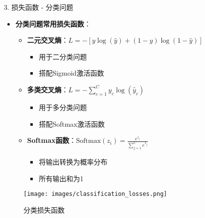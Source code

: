 \documentclass[
  ignorenonframetext,
  aspectratio=169,
  chinese-hans,
]{beamer}
\providecommand{\tightlist}{%
  \setlength{\itemsep}{0pt}\setlength{\parskip}{0pt}}\usepackage{longtable,booktabs,array}
\begin{document}
\begin{frame}{3. 损失函数 - 分类问题}
\label{ux635fux5931ux51fdux6570---ux5206ux7c7bux95eeux9898}
\begin{itemize}
\item
  \textbf{分类问题常用损失函数}：

  \begin{itemize}
  \tightlist
  \item
    \textbf{二元交叉熵}：\(L = -[y\log(\hat{y}) + (1-y)\log(1-\hat{y})]\)

    \begin{itemize}
    \tightlist
    \item
      用于二分类问题
    \item
      搭配Sigmoid激活函数
    \end{itemize}
  \item
    \textbf{多类交叉熵}：\(L = -\sum_{c=1}^{C} y_c \log(\hat{y}_c)\)

    \begin{itemize}
    \tightlist
    \item
      用于多分类问题
    \item
      搭配Softmax激活函数
    \end{itemize}
  \item
    \textbf{Softmax函数}：\(\text{Softmax}(z_i) = \frac{e^{z_i}}{\sum_{j=1}^{C} e^{z_j}}\)

    \begin{itemize}
    \tightlist
    \item
      将输出转换为概率分布
    \item
      所有输出和为1
    \end{itemize}
  \end{itemize}
\end{itemize}

\begin{figure}[H]

{\centering \texttt{[image: images/classification\_losses.png]}

}

\caption{分类损失函数}

\end{figure}%
\end{frame}
\end{document}
